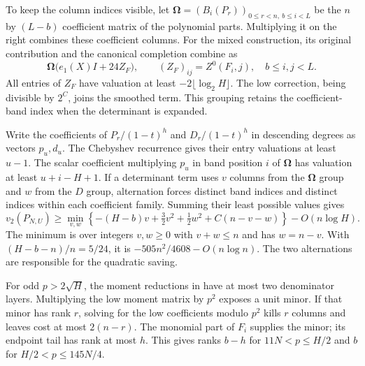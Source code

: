 To keep the column indices visible, let
$\boldsymbol\Omega=(B_i(P_r))_{0\le r<n,\ b\le i<L}$ be the
$n$ by $(L-b)$ coefficient matrix of the polynomial parts. Multiplying
it on the right combines these coefficient columns. For the mixed
construction, its original
contribution and the canonical completion combine as
\[
 \boldsymbol\Omega\bigl(e_1(X)I+24Z_F\bigr),\qquad
 (Z_F)_{ij}=Z^0(F_i,j),\quad b\le i,j<L.
\]
All entries of $Z_F$ have valuation at least $-2\lfloor\log_2H\rfloor$.
The low correction, being divisible by $2^C$, joins the smoothed term.
This grouping retains the coefficient-band index when the determinant
is expanded.

Write the coefficients of $P_r/(1-t)^h$ and $D_r/(1-t)^h$ in descending
degrees as vectors $p_u,d_u$. The Chebyshev recurrence gives their
entry valuations at least $u-1$. The scalar coefficient multiplying
$p_u$ in band position $i$ of $\boldsymbol\Omega$ has valuation at least
$u+i-H+1$. If a determinant term uses $v$ columns from the $\boldsymbol\Omega$
group and $w$ from the $D$ group, alternation forces distinct band
indices and distinct indices within each coefficient family. Summing
their least possible values gives
\[
 v_2(P_{N,U})\ge
 \min_{v,w}\left\{-(H-b)v+\tfrac32v^2+\tfrac12w^2
                   +C(n-v-w)\right\}-O(n\log H).
\]
The minimum is over integers $v,w\ge0$ with $v+w\le n$ and has
$w=n-v$. With $(H-b-n)/n=5/24$, it is
$-505n^2/4608-O(n\log n)$. The two alternations are responsible for
the quadratic saving.

For odd $p>2\sqrt H$, the moment reductions in \cite[Section~3]{OpenAI}
have at most two denominator layers. Multiplying the low moment matrix
by $p^2$ exposes a unit minor. If that minor has rank $r$, solving for
the low coefficients modulo $p^2$ kills $r$ columns and leaves cost at
most $2(n-r)$. The monomial part of $F_i$ supplies the minor; its
endpoint tail has rank at most $h$. This gives ranks $b-h$ for
$11N<p\le H/2$ and $b$ for $H/2<p\le145N/4$.

